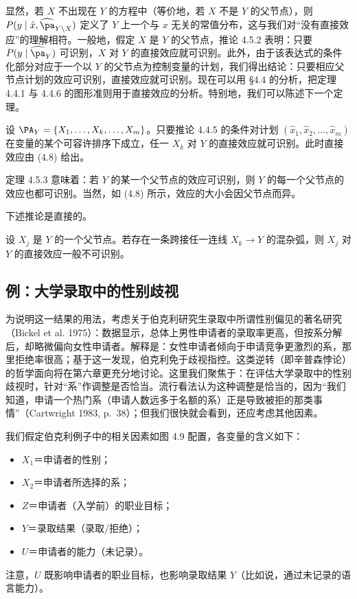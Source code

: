 显然，若 $X$ 不出现在 $Y$ 的方程中（等价地，若 $X$ 不是 $Y$ 的父节点），则 $P(y\mid\hat{x},\widehat{\pa}_{Y\backslash X})$ 定义了 $Y$ 上一个与 $x$ 无关的常值分布，这与我们对“没有直接效应”的理解相符。一般地，假定 $X$ 是 $Y$ 的父节点，推论 4.5.2 表明：只要 $P(y\mid\widehat{\pa}_Y)$ 可识别，$X$ 对 $Y$ 的直接效应就可识别。此外，由于该表达式的条件化部分对应于一个以 $Y$ 的父节点为控制变量的计划，我们得出结论：只要相应父节点计划的效应可识别，直接效应就可识别。现在可以用 \S 4.4 的分析，把定理 4.4.1 与 4.4.6 的图形准则用于直接效应的分析。特别地，我们可以陈述下一个定理。

\begin{theorem}
设 $\PA_Y=\{X_1,\dots,X_k,\dots,X_m\}$。只要推论 4.4.5 的条件对计划 $(\hat{x}_1,\hat{x}_2,\dots,\hat{x}_m)$ 在变量的某个可容许排序下成立，任一 $X_k$ 对 $Y$ 的直接效应就可识别。此时直接效应由 \textup{(4.8)} 给出。
\end{theorem}

定理 4.5.3 意味着：若 $Y$ 的某一个父节点的效应可识别，则 $Y$ 的每一个父节点的效应也都可识别。当然，如 \textup{(4.8)} 所示，效应的大小会因父节点而异。

下述推论是直接的。

\begin{corollary}
设 $X_j$ 是 $Y$ 的一个父节点。若存在一条跨接任一连线 $X_k\to Y$ 的混杂弧，则 $X_j$ 对 $Y$ 的直接效应一般不可识别。
\end{corollary}

\subsection{例：大学录取中的性别歧视}

为说明这一结果的用法，考虑关于伯克利研究生录取中所谓性别偏见的著名研究（Bickel et al. 1975）：数据显示，总体上男性申请者的录取率更高，但按系分解后，却略微偏向女性申请者。解释是：女性申请者倾向于申请竞争更激烈的系，那里拒绝率很高；基于这一发现，伯克利免于歧视指控。这类逆转（即辛普森悖论）的哲学面向将在第六章更充分地讨论。这里我们聚焦于：在评估大学录取中的性别歧视时，针对“系”作调整是否恰当。流行看法认为这种调整是恰当的，因为“我们知道，申请一个热门系（申请人数远多于名额的系）正是导致被拒的那类事情”（Cartwright 1983, p.~38）；但我们很快就会看到，还应考虑其他因素。

我们假定伯克利例子中的相关因素如图 4.9 配置，各变量的含义如下：
\begin{itemize}
\item $X_1$＝申请者的性别；
\item $X_2$＝申请者所选择的系；
\item $Z$＝申请者（入学前）的职业目标；
\item $Y$＝录取结果（录取/拒绝）；
\item $U$＝申请者的能力（未记录）。
\end{itemize}
注意，$U$ 既影响申请者的职业目标，也影响录取结果 $Y$（比如说，通过未记录的语言能力）。

